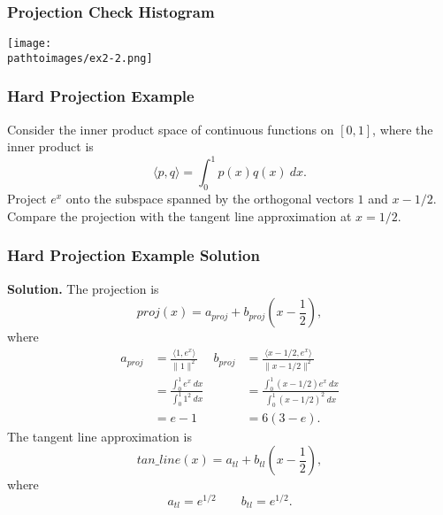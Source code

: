 \documentclass{beamer}
\newcommand{\pathtoimages}{/Users/charlesrambo/Desktop/Bootcamp24/Images}
\begin{document}
\begin{frame}[fragile]
\frametitle{Projection Check Histogram}
\begin{center}
\texttt{[image: \\pathtoimages/ex2-2.png]}
\end{center}
\end{frame}

\begin{frame}[t]
\frametitle{Hard Projection Example}
\begin{Example}
Consider the inner product space of continuous functions on $[0, 1]$, where the inner product is
$$
\langle p, q\rangle = \int_0^1 p(x) q(x)\ dx.
$$
Project $e^x$ onto the subspace spanned by the orthogonal vectors $1$ and $x - 1/2$. Compare the projection with the tangent line approximation at $x = 1/2$.
\end{Example}
\end{frame}

\begin{frame}
\frametitle{Hard Projection Example Solution}
 {\tiny  {\bf Solution.} The projection is
$$
proj(x) = a_{proj}+ b_{proj} \left(x - \frac{1}{2}\right),
$$
where
\begin{align*}
a_{proj}	& = \frac{\langle 1, e^x\rangle}{\|1\|^2}		&	b_{proj} 	&= \frac{\langle x - 1/2, e^x\rangle}{\| x - 1/2 \|^2}\\
		& = \frac{\int_0^1 e^x\ dx}{\int_0^1 1^2\ dx}	&			&= \frac{ \int_0^1 (x - 1/2)e^x\ dx}{\int_0^1 (x - 1/2)^2\ dx} \\
		& = e - 1								&			&=  6(3 - e).
\end{align*}
The tangent line approximation is
$$
tan\_line(x) = a_{tl} + b_{tl} \left(x - \frac{1}{2}\right),
$$
where
$$
a_{tl} = e^{1/2}\qquad b_{tl} = e^{1/2}.
$$
}

\end{frame}
\end{document}
